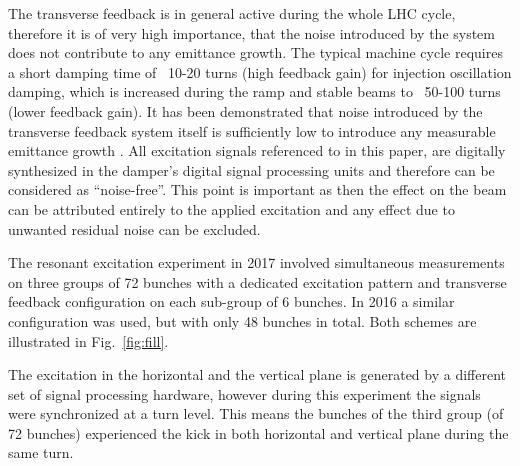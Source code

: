 \documentclass[%
 reprint,
 amsmath,amssymb,
 aps,
prstab,
]{revtex4-1}
\begin{document}
The transverse feedback is in general active during the whole LHC cycle, therefore it is of very high importance, that the noise introduced by the system does not contribute to any emittance growth. The typical machine cycle requires a short damping time of ~10-20 turns (high feedback gain) for injection oscillation damping, which is increased during the ramp and stable beams to ~50-100 turns (lower feedback gain). It has been demonstrated that noise introduced by the transverse feedback system itself is sufficiently low to introduce any measurable emittance growth \cite{adt_noise_emit_2017}. All excitation signals referenced to in this paper, are digitally synthesized in the damper's digital signal processing units and therefore can be considered as ``noise-free''. This point is important as then the effect on the beam can be attributed entirely to the applied excitation and any effect due to unwanted residual noise can be excluded.

The resonant excitation experiment in 2017 involved simultaneous measurements on three groups of 72 bunches with a dedicated excitation pattern and transverse feedback configuration on each sub-group of 6 bunches. In 2016 a similar configuration was used, but with only 48 bunches in total. Both schemes are illustrated in Fig.~\ref{fig:fill}.

The excitation in the horizontal and the vertical plane is generated by a different set of signal processing hardware, however during this experiment the signals were synchronized at a turn level. This means the bunches of the third group (of 72 bunches) experienced the kick in both horizontal and vertical plane during the same turn.
\end{document}
